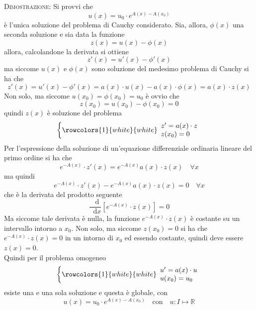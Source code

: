 \documentclass[a4paper]{extarticle}
\newcommand*\dif{\mathop{}\!\mathrm{d}}
\begin{document}
\vspace{2em}
\noindent
\normalfont \normalsize
\textsc{Dimostrazione}: Si provvi che
\[u(x)=u_0 \cdot e^{A(x)-A(x_0)}\]
è l'unica soluzione del problema di Cauchy considerato. Sia, allora, $\phi(x)$ una seconda soluzione e sia data la funzione
\[z(x)=u(x)-\phi(x)\]
allora, calcolandone la derivata si ottiene
\[z'(x)=u'(x)-\phi'(x)\]
ma siccome $u(x)$ e $\phi(x)$ sono soluzione del medesimo problema di Cauchy si ha che
\[z'(x)=u'(x)-\phi'(x)=a(x) \cdot u(x) - a(x) \cdot \phi(x) = a(x) \cdot z(x)\]
Non solo, ma siccome $u(x_0)=\phi(x_0)=u_0$ è ovvio che
\[z(x_0) = u(x_0) - \phi(x_0) = 0\]
quindi $z(x)$ è soluzione del problema
\[\left\{
    \rowcolors{1}{white}{white}
    \begin{array}{lll}
        z'=a(x) \cdot z\\
        z(x_0)=0\\
    \end{array}
\right.\]
Per l'espressione della soluzione di un'equazione differenziale ordinaria lineare del primo ordine si ha che
\[e^{-A(x)} \cdot z'(x) = e^{-A(x)} a(x) \cdot z(x) \hspace{1em} \forall x\]
ma quindi
\[e^{-A(x)} \cdot z'(x) - e^{-A(x)} a(x) \cdot z(x) = 0\hspace{1em} \forall x\]
che è la derivata del prodotto seguente
\[\dfrac{\dif }{\dif x} \left[e^{-A(x)} \cdot z(x)\right] = 0\]
Ma siccome tale derivata è nulla, la funzione $e^{-A(x)} \cdot z(x)$ è costante su un intervallo intorno a $x_0$. Non solo, ma siccome $z(x_0)=0$ si ha che $e^{-A(x)} \cdot z(x)=0$ in un intorno di $x_0$ ed essendo costante, quindi deve essere $z(x)=0 $.\\
Quindi per il problema omogeneo
\[\left\{
    \rowcolors{1}{white}{white}
    \begin{array}{lll}
        u'=a(x) \cdot u\\
        u(x_0)=u_0\\
    \end{array}
\right.\]
esiste una e una sola soluzione e questa è globale, con
\[u(x)=u_0 \cdot e^{A(x)-A(x_0)} \hspace{1em} \text{con} \hspace{1em} u : I \longmapsto \mathbb{R}\]
\end{document}
